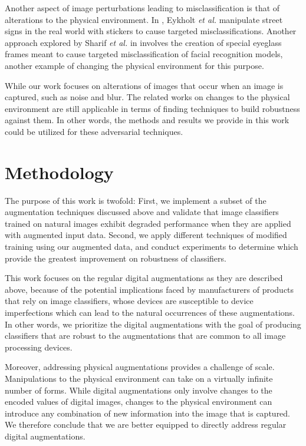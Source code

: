 \documentclass[conference]{IEEEtran}
\begin{document}
Another aspect of image perturbations leading to misclassification is that of alterations to the physical environment. In \cite{robustphysical}, Eykholt {\it et al.} manipulate street signs in the real world with stickers to cause targeted misclassifications. Another approach explored by Sharif {\it et al.} in \cite{Sharif_2019} involves the creation of special eyeglass frames meant to cause targeted misclassification of facial recognition models, another example of changing the physical environment for this purpose.

While our work focuses on alterations of images that occur when an image is captured, such as noise and blur. The related works on changes to the physical environment are still applicable in terms of finding techniques to build robustness against them. In other words, the methods and results we provide in this work could be utilized for these adversarial techniques.

\section{Methodology}

The purpose of this work is twofold: First, we implement a subset of the augmentation techniques discussed above and validate that image classifiers trained on natural images exhibit degraded performance when they are applied with augmented input data. Second, we apply different techniques of modified training using our augmented data, and conduct experiments to determine which provide the greatest improvement on robustness of classifiers.

This work focuses on the regular digital augmentations as they are described above, because of the potential implications faced by manufacturers of products that rely on image classifiers, whose devices are susceptible to device imperfections which can lead to the natural occurrences of these augmentations. In other words, we prioritize the digital augmentations with the goal of producing classifiers that are robust to the augmentations that are common to all image processing devices.

Moreover, addressing physical augmentations provides a challenge of scale. Manipulations to the physical environment can take on a virtually infinite number of forms. While digital augmentations only involve changes to the encoded values of digital images, changes to the physical environment can introduce any combination of new information into the image that is captured. We therefore conclude that we are better equipped to directly address regular digital augmentations.
\end{document}
